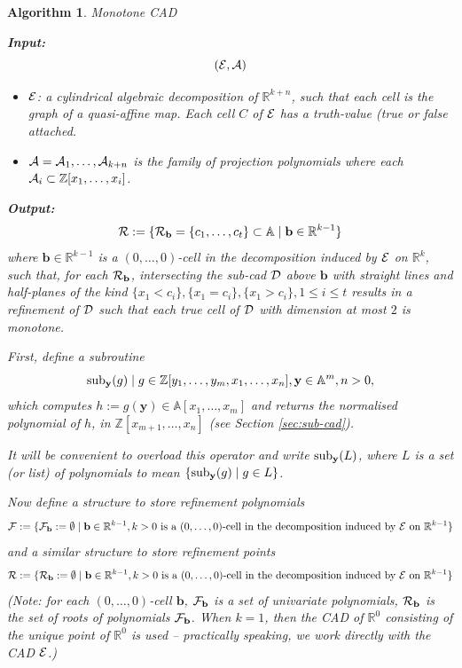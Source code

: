 \documentclass[
]{book}
\newtheorem{algorithm}{Algorithm}
\theoremstyle{definition}
\theoremstyle{definition}
\theoremstyle{definition}
\theoremstyle{definition}
\theoremstyle{remark}
\begin{document}
\begin{algorithm}Monotone CAD

\textbf{Input:}
\[({\cal E}, {\cal A})\]

\begin{itemize}
\item
  \(\cal E\): a cylindrical algebraic decomposition of \(\mathbb{R}^{k+n}\), such that each cell is the graph of a quasi-affine map. Each cell \(C\) of \(\cal E\) has a truth-value (\emph{true} or \emph{false} attached.
\item
  \({\cal A} = {\cal A}_1,\ldots,{\cal A}_{k+n}\) is the family of projection polynomials where each \({\cal A}_i \subset \mathbb{Z}[x_1,\ldots,x_i]\).
\end{itemize}

\textbf{Output:}
\[
{\cal R} := \{ {\cal R}_{\mathbf{b}} = \{ c_1,\ldots,c_t \} \subset \mathbb{A}\mid \mathbf{b} \in \mathbb{R}^{k-1}  \}
\]
where \(\mathbf{b} \in \mathbb{R}^{k-1}\) is a \((0,\ldots,0)\)-cell in the decomposition induced by \({\cal E}\) on \(\mathbb{R}^k\),
such that, for each \({\cal R}_\mathbf{b}\), intersecting the sub-cad \(\cal D\) above \(\mathbf{b}\) with straight lines and half-planes of the kind \(\{x_1 < c_i \}, \{x_1 = c_i \}, \{x_1 > c_i\}, 1 \le i \le t\) results in a refinement of \(\cal D\) such that each true cell of \(\cal D\) with dimension at most \(2\) is monotone.

First, define a subroutine
\[
{\rm sub}_{\mathbf{y}} (g) \mid g \in \mathbb{Z}[y_1,\ldots,y_m,x_1,\ldots,x_n], \mathbf{y} \in \mathbb{A}^m, n > 0,
\]
which computes \(h := g(\mathbf{y}) \in \mathbb{A}[x_{1},\ldots,x_m]\) and returns the normalised polynomial of \(h\), in \(\mathbb{Z}[x_{m+1},\ldots,x_n]\) (see Section \ref{sec:sub-cad}).

It will be convenient to overload this operator and write \({\rm sub}_{\mathbf{y}} (L)\), where \(L\) is a set (or list) of polynomials to mean \(\{ {\rm sub}_{\mathbf{y}} (g) \mid g \in L \}\).

Now define a structure to store refinement polynomials
\[
{\cal F} := \{ {\cal F}_{\mathbf{b}} := \emptyset \mid \mathbf{b} \in \mathbb{R}^{k-1}, k > 0 \text{ is a } (0,\ldots,0) \text{-cell in the decomposition induced by } {\cal E} \text{ on } \mathbb{R}^{k-1} \}
\]
and a similar structure to store refinement points
\[
{\cal R} := \{ {\cal R}_{\mathbf{b}} := \emptyset \mid \mathbf{b} \in \mathbb{R}^{k-1}, k > 0 \text{ is a } (0,\ldots,0) \text{-cell in the decomposition induced by } {\cal E} \text{ on } \mathbb{R}^{k-1} \}
\]
\emph{(Note: for each \((0,\ldots,0)\)-cell \(\mathbf{b}\), \({\cal F}_\mathbf{b}\) is a set of univariate polynomials, \({\cal R}_{\mathbf{b}}\) is the set of roots of polynomials \({\cal F}_\mathbf{b}\). When \(k=1\), then the CAD of \(\mathbb{R}^0\) consisting of the unique point of \(\mathbb{R}^0\) is used -- practically speaking, we work directly with the CAD \(\cal E\).)}


\end{algorithm}
\end{document}
